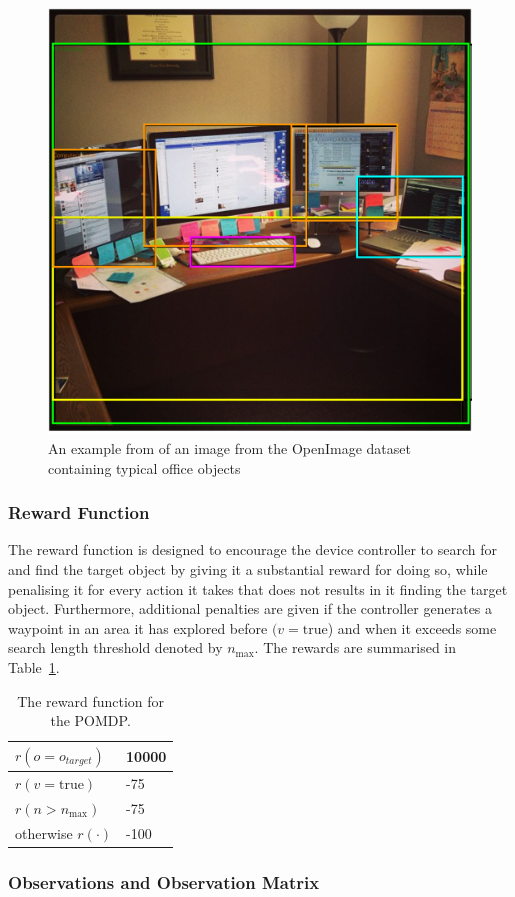 \documentclass[runningheads]{llncs}
\begin{document}
\begin{figure}
  \centering
  \includegraphics[width=0.5\columnwidth]{figures/desk_example.png}
  \caption{An example from of an image from the OpenImage dataset~\cite{openimages} containing typical office objects}\label{fig:openimage}
\end{figure}

\subsubsection{Reward Function}

The reward function is designed to encourage the device controller to search for and find the target object by giving it a substantial reward for doing so, while penalising it for every action it takes that does not results in it finding the target object.
Furthermore, additional penalties are given if the controller generates a waypoint in an area it has explored before $(v = \textrm{true}$) and when it exceeds some search length threshold denoted by $n_{\max}$.
The rewards are summarised in Table~\ref{tab:rewards}.

\begin{table}[h]
  \centering
  \caption{The reward function for the POMDP. }\label{tab:rewards}
  \begin{tabular}{p{3cm}p{1cm}}
    \toprule
    $r(o = o_{target})$ & 10000 \\ \midrule
    $r(v = \textrm{true})$  & -75 \\ \midrule
    $r(n > n_{\max})$ & -75 \\ \midrule
    otherwise $r(\cdot)$ & -100  \\ \midrule
    \bottomrule
  \end{tabular}
\end{table}

\subsubsection{Observations and Observation Matrix}
\end{document}
